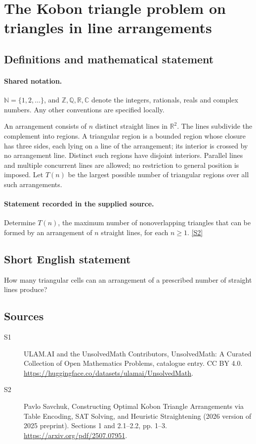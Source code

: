 \documentclass[11pt]{article}
\newcommand{\sref}[2]{\hyperlink{source:#1:#2}{[S#2]}}
\begin{document}
\section{The Kobon triangle problem on triangles in line arrangements}\label{statement}

\subsection{Definitions and mathematical statement}

\paragraph{Shared notation.}$\mathbb N=\{1,2,\ldots\}$, and $\mathbb Z,\mathbb Q,\mathbb R,\mathbb C$ denote the integers, rationals, reals and complex numbers. Any other conventions are specified locally.


An arrangement consists of $n$ distinct straight lines in $\mathbb R^2$. The lines subdivide the complement into regions. A triangular region is a bounded region whose closure has three sides, each lying on a line of the arrangement; its interior is crossed by no arrangement line. Distinct such regions have disjoint interiors. Parallel lines and multiple concurrent lines are allowed; no restriction to general position is imposed. Let $T(n)$ be the largest possible number of triangular regions over all such arrangements.
\paragraph{Statement recorded in the supplied source.}
Determine $T(n)$, the maximum number of nonoverlapping triangles that can be formed by an arrangement of $n$ straight lines, for each $n\geq1$. \sref{statement}{2}
\subsection{Short English statement}
How many triangular cells can an arrangement of a prescribed number of straight lines produce?
\subsection{Sources}
\begin{description}
\item[\hypertarget{source:statement:1}{S1}] ULAM.AI and the UnsolvedMath Contributors, UnsolvedMath: A Curated Collection of Open Mathematics Problems, catalogue entry. CC BY 4.0. \url{https://huggingface.co/datasets/ulamai/UnsolvedMath}.
\item[\hypertarget{source:statement:2}{S2}] Pavlo Savchuk, Constructing Optimal Kobon Triangle Arrangements via Table Encoding, SAT Solving, and Heuristic Straightening (2026 version of 2025 preprint). Sections 1 and 2.1–2.2, pp. 1–3. \url{https://arxiv.org/pdf/2507.07951}.
\end{description}
\label{end:statement}
\end{document}
